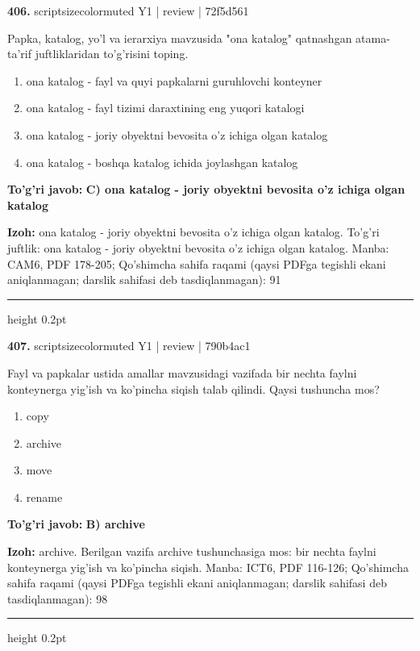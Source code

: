 \documentclass[10pt,a4paper]{article}
\begin{document}
{\bfseries\sffamily\color{ink} 406.} {scriptsizecolor{muted} Y1 | review | 72f5d561}
\par
Papka, katalog, yo'l va ierarxiya mavzusida "ona katalog" qatnashgan atama-ta'rif juftliklaridan to'g'risini toping.
\begin{enumerate}[label=\Alph*),leftmargin=9mm]
\item ona katalog - fayl va quyi papkalarni guruhlovchi konteyner
\item ona katalog - fayl tizimi daraxtining eng yuqori katalogi
\item ona katalog - joriy obyektni bevosita o'z ichiga olgan katalog
\item ona katalog - boshqa katalog ichida joylashgan katalog
\end{enumerate}
\begin{tcolorbox}[enhanced,breakable,colback=teal!4,colframe=teal!60!black,boxrule=0.45pt,arc=1.2mm,left=2.7mm,right=2.7mm,top=1.8mm,bottom=1.8mm,before skip=2mm,after skip=2mm]
{\bfseries\sffamily\color{teal}To'g'ri javob:} \textbf{C) ona katalog - joriy obyektni bevosita o'z ichiga olgan katalog}
\par\smallskip
{\bfseries Izoh:} ona katalog - joriy obyektni bevosita o'z ichiga olgan katalog. To'g'ri juftlik: ona katalog - joriy obyektni bevosita o'z ichiga olgan katalog. Manba: CAM6, PDF 178-205; Qo'shimcha sahifa raqami (qaysi PDFga tegishli ekani aniqlanmagan; darslik sahifasi deb tasdiqlanmagan): 91
\end{tcolorbox}
\vspace{2mm}\hrule height 0.2pt\vspace{3mm}

{\bfseries\sffamily\color{ink} 407.} {scriptsizecolor{muted} Y1 | review | 790b4ac1}
\par
Fayl va papkalar ustida amallar mavzusidagi vazifada bir nechta faylni konteynerga yig'ish va ko'pincha siqish talab qilindi. Qaysi tushuncha mos?
\begin{enumerate}[label=\Alph*),leftmargin=9mm]
\item copy
\item archive
\item move
\item rename
\end{enumerate}
\begin{tcolorbox}[enhanced,breakable,colback=teal!4,colframe=teal!60!black,boxrule=0.45pt,arc=1.2mm,left=2.7mm,right=2.7mm,top=1.8mm,bottom=1.8mm,before skip=2mm,after skip=2mm]
{\bfseries\sffamily\color{teal}To'g'ri javob:} \textbf{B) archive}
\par\smallskip
{\bfseries Izoh:} archive. Berilgan vazifa archive tushunchasiga mos: bir nechta faylni konteynerga yig'ish va ko'pincha siqish. Manba: ICT6, PDF 116-126; Qo'shimcha sahifa raqami (qaysi PDFga tegishli ekani aniqlanmagan; darslik sahifasi deb tasdiqlanmagan): 98
\end{tcolorbox}
\vspace{2mm}\hrule height 0.2pt\vspace{3mm}
\end{document}
